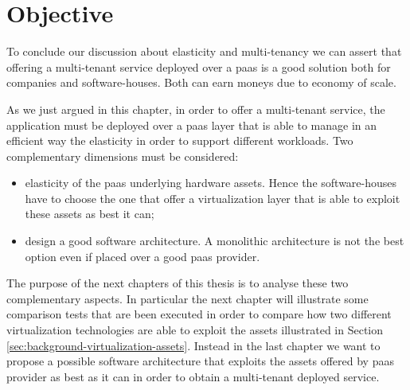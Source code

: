 %
%
\section{Objective}
\label{sec:elasticity-objective}
To conclude our discussion about elasticity and multi-tenancy we can assert that offering a multi-tenant
service deployed over a \ac{paas} is a good solution both for companies and software-houses. Both can
earn moneys due to economy of scale.

As we just argued in this chapter, in order to offer a multi-tenant service, the application must be
deployed over a \ac{paas} layer that is able to manage in an efficient way the elasticity in order to
support different workloads. Two complementary dimensions must be considered:

\begin{itemize}
	\item{elasticity of the \ac{paas} underlying hardware assets. Hence the software-houses have to
		choose the one that offer a virtualization layer that is able to exploit these assets as best it
		can;}
	\item{design a good software architecture. A monolithic architecture is not the best option even if
		placed over a good \ac{paas} provider.}
\end{itemize}

The purpose of the next chapters of this thesis is to analyse these two complementary aspects. In particular
the next chapter will illustrate some comparison tests that are been executed in order to compare how two
different virtualization technologies are able to exploit the assets illustrated in Section
\ref{sec:background-virtualization-assets}. Instead in the last chapter we want to propose a possible
software architecture that exploits the assets offered by \ac{paas} provider as best as it can
in order to obtain a multi-tenant deployed service.